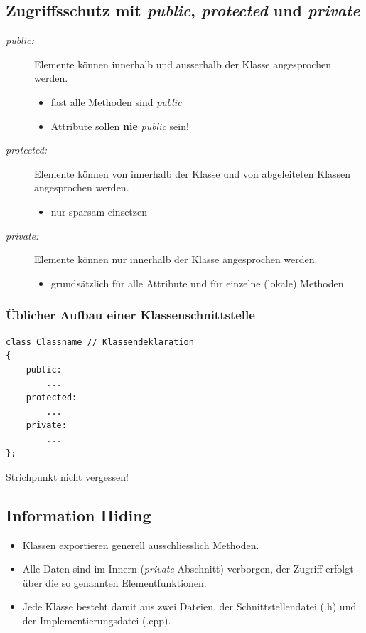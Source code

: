 \begin{multicols}{2}
\subsection{Zugriffsschutz mit \emph{public}, \emph{protected} und \emph{private}}
\begin{description}
	\item [\emph{public:}] Elemente können innerhalb und ausserhalb der Klasse angesprochen werden.
	\begin{itemize}
		\item fast alle Methoden sind \emph{public}
		\item Attribute sollen \textbf{nie} \emph{public} sein!
	\end{itemize}
	\item [\emph{protected:}] Elemente können von innerhalb der Klasse und von abgeleiteten Klassen angesprochen werden.
	\begin{itemize}
		\item nur sparsam einsetzen
	\end{itemize}
	\item [\emph{private:}] Elemente können nur innerhalb der Klasse angesprochen werden.
	\begin{itemize}
		\item grundsätzlich für alle Attribute und für einzelne (lokale) Methoden
	\end{itemize}
\end{description}
\vfill\null
\columnbreak
\subsubsection{Üblicher Aufbau einer Klassenschnittstelle}
\vspace{-\baselineskip}
\begin{minipage}{\linewidth}
\begin{lstlisting}
class Classname	// Klassendeklaration
{
	public:
		...
	protected:
		...
	private:
		...
};
\end{lstlisting}
\end{minipage}
\begin{achtung}
	Strichpunkt nicht vergessen!
\end{achtung}
\end{multicols}

\subsection{Information Hiding}
\begin{itemize}
	\item Klassen exportieren generell ausschliesslich Methoden.
	\item[\-] Alle Daten sind im Innern (\emph{private}-Abschnitt) verborgen, der Zugriff erfolgt über die so genannten Elementfunktionen.
	\item Jede Klasse besteht damit aus zwei Dateien, der Schnittstellendatei (.h) und der Implementierungsdatei (.cpp).
\end{itemize}
\clearpage

